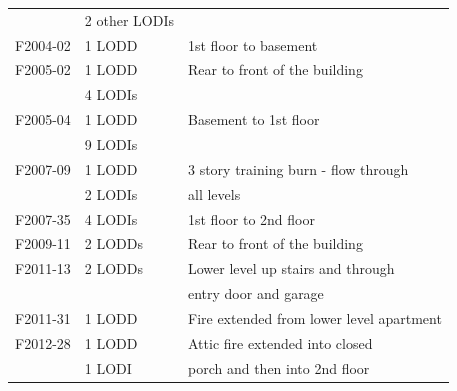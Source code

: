 \documentclass[12pt,oneside]{book}
\begin{document}
\begin{table}[!ht]
\begin{tabular}{lll}
                                    &  2 other LODIs      &                                            \\
F2004-02 \cite{NIOSH:Berardinelli}  &  1 LODD             &  1st floor to basement                     \\
F2005-02 \cite{NIOSH:Koedam}        &  1 LODD             &  Rear to front of the building             \\
                                    &  4 LODIs            &                                            \\
F2005-04 \cite{NIOSH:McFall4}       &  1 LODD             &  Basement to 1st floor                     \\
                                    &  9 LODIs            &                                            \\
F2007-09 \cite{NIOSH:Tarley}        &  1 LODD             &  3 story training burn - flow through      \\
                                    &  2 LODIs            &  all levels                                \\
F2007-35 \cite{NIOSH:Braddee}       &  4 LODIs            &  1st floor to 2nd floor                    \\
F2009-11 \cite{NIOSH:Merinar}       &  2 LODDs            &  Rear to front of the building             \\
F2011-13 \cite{NIOSH:Bowyer2}       &  2 LODDs            &  Lower level up stairs and through         \\
                                    &                     &  entry door and garage                     \\
F2011-31 \cite{NIOSH:Loflin}        &  1 LODD             &  Fire extended from lower level apartment  \\
F2012-28 \cite{NIOSH:Bowyer}        &  1 LODD             &  Attic fire extended into closed           \\
                                    &  1 LODI             &  porch and then into 2nd floor             \\
\bottomrule
\end{tabular}
\label{tab:LODD}
\end{table}

\clearpage
\end{document}
